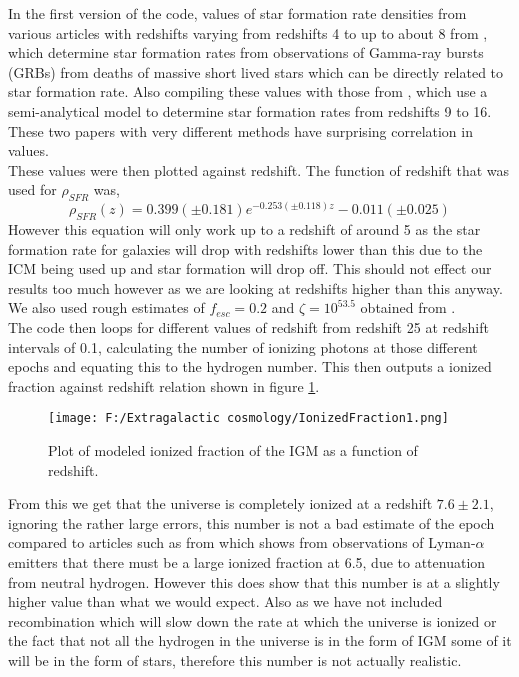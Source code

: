 \documentclass{article}
\begin{document}
\indent In the first version of the code, values of star formation rate densities from  various articles with redshifts varying from redshifts 4 to up to about 8 from \cite{2010MNRAS.401.2561W}, which determine star formation rates from observations of Gamma-ray bursts (GRBs) from deaths of massive short lived stars which can be directly related to star formation rate. Also compiling these values with those from \cite{2012ApJ...759L..38A}, which use a semi-analytical model to determine star formation rates from redshifts 9 to 16. These two papers with very different methods have surprising correlation in values.\\
These values were then plotted against redshift. The function of redshift that was used for $\rho_{SFR}$ was,
\begin{equation}
\rho_{SFR}(z)=0.399(\pm0.181)e^{-0.253(\pm0.118)z}-0.011(\pm0.025)
\end{equation}
However this equation will only work up to a redshift of around 5 as the star formation rate for galaxies will drop with redshifts lower than this due to the ICM being used up and star formation will drop off. This should not effect our results too much however as we are looking at redshifts higher than this anyway.\\
We also used rough estimates of $f_{esc}=0.2$ and $\zeta=10^{53.5}$ obtained from \cite{2010Natur.468...49R}.\\
\indent The code then loops for different values of redshift from redshift 25 at redshift intervals of 0.1, calculating the number of ionizing photons at those different epochs and equating this to the hydrogen number. This then outputs a ionized fraction against redshift relation shown in figure \ref{fig:IonizedFraction1}.\\

\begin{figure}
	\centering
		\texttt{[image: F:/Extragalactic cosmology/IonizedFraction1.png]}
		\caption{Plot of modeled ionized fraction of the IGM as a function of redshift.} 
	\label{fig:IonizedFraction1}
\end{figure}

From this we get that the universe is completely ionized at a redshift $7.6\pm2.1$, ignoring the rather large errors, this number is not a bad estimate of the epoch compared to articles such as from \cite{Ota:arXiv0707.1561} which shows from observations of Lyman-$\alpha$ emitters that there must be a large ionized fraction at 6.5, due to attenuation from neutral hydrogen. However this does show that this number is at a slightly higher value than what we would expect. Also as we have not included recombination which will slow down the rate at which the universe is ionized or the fact that not all the hydrogen in the universe is in the form of IGM some of it will be in the form of stars, therefore this number is not actually realistic.\\
\end{document}
